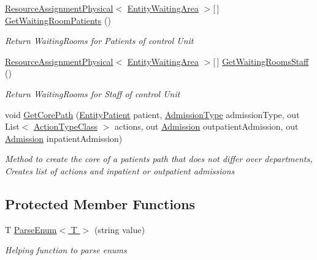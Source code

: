 \begin{DoxyCompactItemize}
\hyperlink{class_general_health_care_elements_1_1_resource_handling_1_1_resource_assignment_physical}{Resource\+Assignment\+Physical}$<$ \hyperlink{class_general_health_care_elements_1_1_entities_1_1_entity_waiting_area}{Entity\+Waiting\+Area} $>$\mbox{[}$\,$\mbox{]} \hyperlink{class_general_health_care_elements_1_1_input_1_1_generic_x_m_l_department_input_a95c21e798a80a0d2d962f7a72b6cf20b}{Get\+Waiting\+Room\+Patients} ()
\begin{DoxyCompactList}\small\item\em Return Waiting\+Rooms for Patients of control Unit \end{DoxyCompactList}\item 
\hyperlink{class_general_health_care_elements_1_1_resource_handling_1_1_resource_assignment_physical}{Resource\+Assignment\+Physical}$<$ \hyperlink{class_general_health_care_elements_1_1_entities_1_1_entity_waiting_area}{Entity\+Waiting\+Area} $>$\mbox{[}$\,$\mbox{]} \hyperlink{class_general_health_care_elements_1_1_input_1_1_generic_x_m_l_department_input_a9468bc80afed514edd2c528064c0105b}{Get\+Waiting\+Rooms\+Staff} ()
\begin{DoxyCompactList}\small\item\em Return Waiting\+Rooms for Staff of control Unit \end{DoxyCompactList}\item 
void \hyperlink{class_general_health_care_elements_1_1_input_1_1_generic_x_m_l_department_input_ac7de165168efccce4164df3d9e785571}{Get\+Core\+Path} (\hyperlink{class_general_health_care_elements_1_1_entities_1_1_entity_patient}{Entity\+Patient} patient, \hyperlink{class_general_health_care_elements_1_1_treatment_admission_types_1_1_admission_type}{Admission\+Type} admission\+Type, out List$<$ \hyperlink{class_general_health_care_elements_1_1_general_classes_1_1_action_types_and_paths_1_1_action_type_class}{Action\+Type\+Class} $>$ actions, out \hyperlink{class_general_health_care_elements_1_1_treatment_admission_types_1_1_admission}{Admission} outpatient\+Admission, out \hyperlink{class_general_health_care_elements_1_1_treatment_admission_types_1_1_admission}{Admission} inpatient\+Admission)
\begin{DoxyCompactList}\small\item\em Method to create the core of a patients path that does not differ over departments, Creates list of actions and inpatient or outpatient admissions \end{DoxyCompactList}\end{DoxyCompactItemize}
\subsection*{Protected Member Functions}
\begin{DoxyCompactItemize}
\item 
T \hyperlink{class_general_health_care_elements_1_1_input_1_1_generic_x_m_l_department_input_aed3c908026b70f3506c79b4e3758ab25}{Parse\+Enum$<$ T $>$} (string value)
\begin{DoxyCompactList}\small\item\em Helping function to parse enums \end{DoxyCompactList}\end{DoxyCompactItemize}
